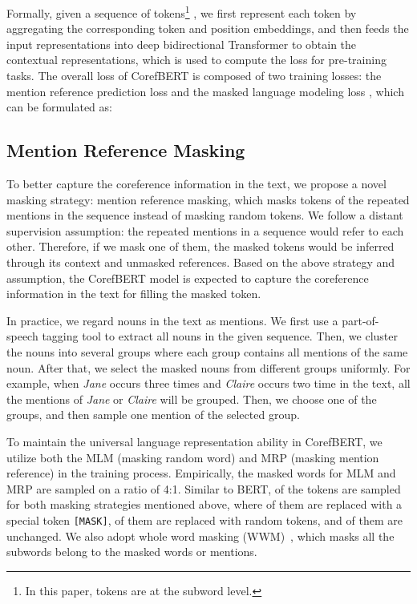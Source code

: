 \documentclass[11pt,a4paper]{article}
\newcommand\CorefBERT{CorefBERT\xspace}
\begin{document}
Formally, given a sequence of tokens\footnote{In this paper, tokens are at the subword level.} , we first represent each token by aggregating the corresponding token and position embeddings, and then feeds the input representations into deep bidirectional Transformer to obtain the contextual representations, which is used to compute the loss for pre-training tasks. The overall loss of \CorefBERT is composed of two training losses: the mention reference prediction loss  and the masked language modeling loss , which can be formulated as:








\subsection{Mention Reference Masking}

To better capture the coreference information in the text, we propose a novel masking strategy: mention reference masking, which masks tokens of the repeated mentions in the sequence instead of masking random tokens. We follow a distant supervision assumption: the repeated mentions in a sequence would refer to each other. Therefore, if we mask one of them, the masked tokens would be inferred through its context and  unmasked references. Based on the above strategy and assumption, the CorefBERT model is expected to capture the coreference information in the text for filling the masked token. 


In practice, we regard nouns in the text as mentions. We first use a part-of-speech tagging tool to extract all nouns in the given sequence. 
Then, we cluster the nouns into several groups where each group contains all mentions of the same noun. After that, we select the masked nouns from different groups uniformly. For example, when \emph{Jane} occurs three times and \emph{Claire} occurs two time in the text, all the mentions of \emph{Jane} or \emph{Claire} will be grouped.  Then, we choose one of the groups, and then sample one mention of the selected group.


To maintain the universal language representation ability in \CorefBERT, we utilize both the MLM (masking random word) and MRP (masking mention reference)  in the training process. Empirically, the masked words for MLM and MRP are sampled on a ratio of 4:1. Similar to BERT,  of the tokens are sampled for both masking strategies mentioned above, where  of them are replaced with a special token \texttt{[MASK]}, 
 of them are replaced with random tokens, and  of them are unchanged.
We also adopt whole word masking (WWM)~\citep{Spanbert}, which masks all the subwords belong to the masked words or mentions.
\end{document}
